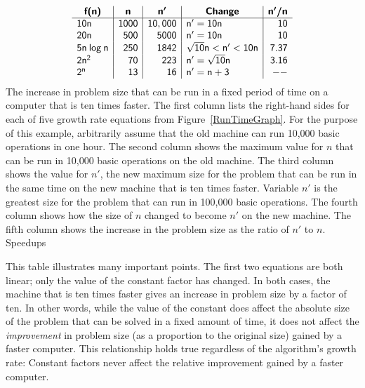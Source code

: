\begin{mytable}
{\sffamily
\[
\begin{array}
{l|r|r|l|r}
\multicolumn{1}{c}{\mbox{\sffamily\textbf{f(n)}}} &
\multicolumn{1}{|c}{\mbox{\sffamily\textbf{n}}} & 
\multicolumn{1}{|c}{\mbox{\sffamily\textbf{n\boldmath$'$}}} &
\multicolumn{1}{|c}{\mbox{\sffamily\textbf{Change}}} &
\multicolumn{1}{|c}{\mbox{\sffamily\textbf{n\boldmath$'$/n}}}\\
\hline
\mathsf{10n}     & \mathsf{1000} & \mathsf{10,000} & \mathsf{n' = 10n} & \mathsf{10}\\
\mathsf{20n}     & \mathsf{500}   & \mathsf{5000}  & \mathsf{n' = 10n} & \mathsf{10}\\
\mathsf{5 n\:log\:n} & \mathsf{250} & \mathsf{1842} & \mathsf{\sqrt{10} n < n' < 10n} & \mathsf{7.37}\\
\mathsf{2 n^2}   & \mathsf{70}    & \mathsf{223}    & \mathsf{n' = \sqrt{10} n} & \mathsf{3.16}\\
\mathsf{2^n}     & \mathsf{13}    & \mathsf{16}     & \mathsf{n' = n + 3} & \mathsf{--}\\
\end{array}
\]
}
{The increase in problem size that can be run
in a fixed period of time on a computer that is ten times faster.
The first column lists the right-hand sides for each of five
growth rate equations from Figure~\ref{RunTimeGraph}.
For the purpose of this example, arbitrarily assume that the old
machine can run 10,000 basic operations
in one hour.
The second column shows the maximum value for \(n\) that can be run
in 10,000 basic operations on the old machine.
The third column shows the value for \(n'\), the new maximum
size for the problem that can be run in the same time on the new
machine that is ten times faster.
Variable \(n'\) is the greatest size for the problem that can run in
100,000 basic operations.
The fourth column shows how the size of \(n\) changed to become \(n'\) on
the new machine.
The fifth column shows the increase in the problem size as the ratio of
\(n'\) to \(n\).}
{Speedups}
\bigskip\smallskip
\end{mytable}

This table illustrates many important points.
The first two equations are both linear; only the value of the
constant factor has changed.
In both cases, the machine that is ten times faster gives an increase
in problem size by a factor of ten.
In other words, while the value of the constant
does affect the absolute size of the problem that can be solved in a
fixed amount of time, it does not affect the \emph{improvement} in
problem size (as a proportion to the original size) gained by a faster
computer.
This relationship holds true regardless of the algorithm's growth
rate:
Constant factors never affect the relative improvement gained
by a faster computer.

